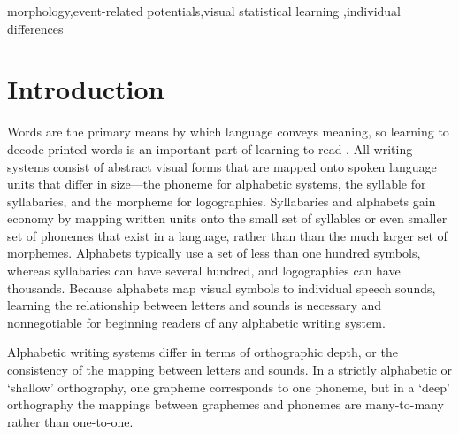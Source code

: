 \documentclass[review]{elsarticle}
\begin{document}
\begin{frontmatter}

\begin{keyword}
 morphology\sep event-related potentials\sep visual statistical learning \sep individual differences
\end{keyword}

\end{frontmatter}

\linenumbers

\section{Introduction}

Words are the primary means by which language conveys meaning, so learning to decode printed words is an important part of learning to read \citep[e.g.,][]{castlesEndingReadingWars2018} .  All writing systems consist of abstract visual forms that are mapped onto spoken language units that differ in size—the phoneme for alphabetic systems, the syllable for syllabaries, and the morpheme for logographies. Syllabaries and alphabets gain economy by mapping written units onto the small set of syllables or even smaller set of phonemes  that exist in a language, rather than than the much larger set of morphemes. Alphabets typically use a set of less than one hundred symbols, whereas syllabaries can have several hundred, and logographies can have thousands. Because alphabets map visual symbols to individual speech sounds,  learning the relationship between letters and sounds is necessary and nonnegotiable for beginning readers of any alphabetic writing system.

Alphabetic writing systems differ in terms of orthographic depth, or the consistency of the mapping between letters and sounds. In a strictly alphabetic or ‘shallow’ orthography, one grapheme corresponds to one phoneme, but in a ‘deep’ orthography the mappings between graphemes and phonemes  are many-to-many rather than one-to-one. 
\end{document}
